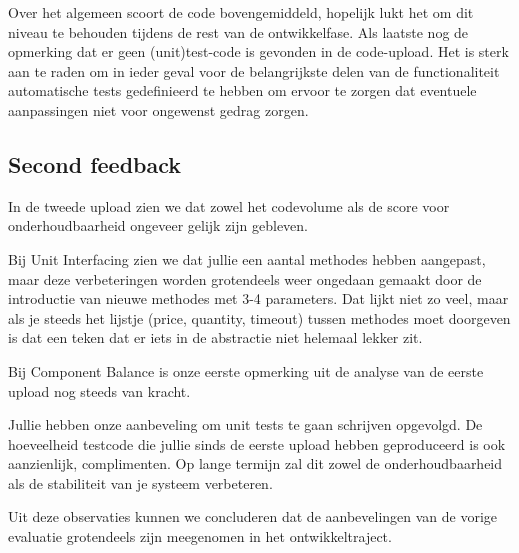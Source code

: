 Over het algemeen scoort de code bovengemiddeld, hopelijk lukt het om dit niveau te behouden tijdens de rest van de ontwikkelfase.
Als laatste nog de opmerking dat er geen (unit)test-code is gevonden in de code-upload.
Het is sterk aan te raden om in ieder geval voor de belangrijkste delen van de functionaliteit automatische tests gedefinieerd te hebben om ervoor te zorgen dat eventuele aanpassingen niet voor ongewenst gedrag zorgen.

\subsection{Second feedback}

In de tweede upload zien we dat zowel het codevolume als de score voor onderhoudbaarheid ongeveer gelijk zijn gebleven.

Bij Unit Interfacing zien we dat jullie een aantal methodes hebben aangepast, maar deze verbeteringen worden grotendeels weer ongedaan gemaakt door de introductie van nieuwe methodes met 3-4 parameters.
Dat lijkt niet zo veel, maar als je steeds het lijstje (price, quantity, timeout) tussen methodes moet doorgeven is dat een teken dat er iets in de abstractie niet helemaal lekker zit.

Bij Component Balance is onze eerste opmerking uit de analyse van de eerste upload nog steeds van kracht.

Jullie hebben onze aanbeveling om unit tests te gaan schrijven opgevolgd.
De hoeveelheid testcode die jullie sinds de eerste upload hebben geproduceerd is ook aanzienlijk, complimenten.
Op lange termijn zal dit zowel de onderhoudbaarheid als de stabiliteit van je systeem verbeteren.

Uit deze observaties kunnen we concluderen dat de aanbevelingen van de vorige evaluatie grotendeels zijn meegenomen in het ontwikkeltraject.